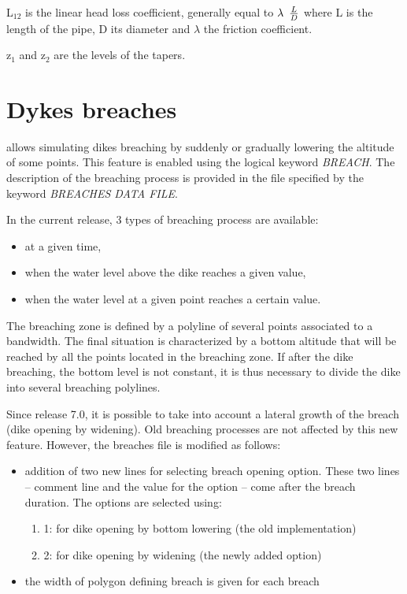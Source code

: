  L${}_{12}$ is the linear head loss coefficient, generally equal to $\lambda {\kern 1pt} {\kern 1pt} {\kern 1pt} {\kern 1pt} {\kern 1pt} \frac{L}{D} $ where L is the length of the pipe, D its diameter and $\lambda$ the friction coefficient.

 z${}_{1}$ and z${}_{2}$ are the levels of the tapers.


\section{ Dykes breaches}
\label{sec:dykes}
  allows simulating dikes breaching by suddenly or gradually lowering the altitude of some points. This feature is enabled using the logical keyword \textit{BREACH}. The description of the breaching process is provided in the file specified by the keyword \textit{BREACHES DATA FILE}.

 In the current release, 3 types of breaching process are available:

\begin{itemize}
\item  at a given time,

\item  when the water level above the dike reaches a given value,

\item  when the water level at a given point reaches a certain value.
\end{itemize}

 The breaching zone is defined by a polyline of several points associated to a bandwidth. The final situation is characterized by a bottom altitude that will be reached by all the points located in the breaching zone. If after the dike breaching, the bottom level is not constant, it is thus necessary to divide the dike into several breaching polylines.

 Since release 7.0, it is possible to take into account a lateral growth of the breach (dike opening by widening). Old breaching processes are not affected by this new feature. However, the breaches file is modified as follows:

\begin{itemize}
\item  addition of two new lines for selecting breach opening option. These two lines -- comment line and the value for the option -- come after the breach duration. The options are selected using:
\begin{enumerate}
\item [\nonumber] 1: for dike opening by bottom lowering (the old implementation)

\item [\nonumber] 2: for dike opening by widening (the newly added option)

\end{enumerate}
\item  the width of polygon defining breach is given for each breach
\end{itemize}

